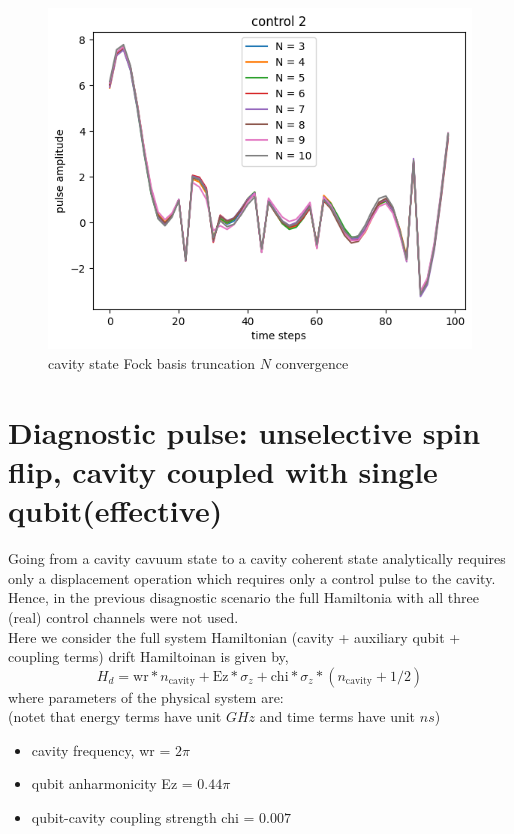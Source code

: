 \documentclass[12pt]{report}
\begin{document}
\begin{figure}[H]
    \centering
    \includegraphics[width=0.95\linewidth]{check_convergence_control2.png}
    \caption{cavity state Fock basis truncation $N$ convergence}
    \label{fig:check_convergence_control2}
\end{figure}

\section{Diagnostic pulse: unselective spin flip, cavity coupled with single qubit(effective)}
Going from a cavity cavuum state to a cavity coherent state analytically requires only a displacement operation
which requires only a control pulse to the cavity. Hence, in the previous disagnostic scenario the full Hamiltonia
with all three (real) control channels were not used.
\\
Here we consider the full system Hamiltonian (cavity + auxiliary qubit + coupling terms)
drift Hamiltoinan is given by, 
\begin{equation}
    H_d = \text{wr} * n_{\text{cavity}} + \text{Ez} * \sigma_z + \text{chi} * \sigma_z * (n_{\text{cavity}} + 1/2 )    
\end{equation}
where parameters of the physical system are:
\\
(notet that energy terms have unit $GHz$ and time terms have unit $ns$)
\begin{itemize}
    \item cavity frequency, wr = $2 \pi$
    \item qubit anharmonicity Ez = $0.44 \pi$
    \item qubit-cavity coupling strength chi = $0.007$
\end{itemize}
\end{document}
